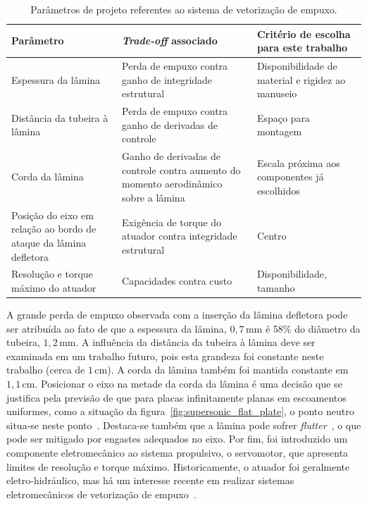\begin{table}[htbp]
    \centering\begin{tabular}{p{.3\linewidth}p{.3\linewidth}p{.3\linewidth}} \toprule
        Parâmetro & \textit{Trade-off} associado & Critério de escolha para este trabalho \\[.3cm] \midrule
        Espessura da lâmina & Perda de empuxo contra ganho de integridade estrutural & Disponibilidade de material e rigidez ao manuseio  \\[.3cm]
        Distância da tubeira à lâmina & Perda de empuxo contra ganho de derivadas de controle & Espaço para montagem\\[.3cm]
        Corda da lâmina & Ganho de derivadas de controle contra aumento do momento aerodinâmico sobre a lâmina & Escala próxima aos componentes já escolhidos\\[.3cm]
        Posição do eixo em relação ao bordo de ataque da lâmina defletora & Exigência de torque do atuador contra integridade estrutural & Centro\\[.3cm]
        Resolução e torque máximo do atuador & Capacidades contra custo & Disponibilidade, tamanho \\ \bottomrule
    \end{tabular}
    \caption{Parâmetros de projeto referentes ao sistema de vetorização de empuxo.}\label{tab:proj_params}
\end{table}

A grande perda de empuxo observada com a inserção da lâmina defletora pode ser atribuída ao fato de que a espessura da lâmina, \(0,7\,\mathrm{mm}\) é 58\% do diâmetro da tubeira, \(1,2\,\mathrm{mm}\). A influência da distância da tubeira à lâmina deve ser examinada em um trabalho futuro, pois esta grandeza foi constante neste trabalho (cerca de \(1\,\mathrm{cm}\)). A corda da lâmina também foi mantida constante em \(1,1\,\mathrm{cm}\). Posicionar o eixo na metade da corda da lâmina é uma decisão que se justifica pela previsão de que para placas infinitamente planas em escoamentos uniformes, como a situação da figura~\ref{fig:supersonic_flat_plate}, o ponto neutro situa-se neste ponto~\cite{anderson}. Destaca-se também que a lâmina pode sofrer \textit{flutter}~\cite{flutter}, o que pode ser mitigado por engastes adequados no eixo. Por fim, foi introduzido um componente eletromecânico ao sistema propulsivo, o servomotor, que apresenta limites de resolução e torque máximo. Historicamente, o atuador foi geralmente eletro-hidráulico, mas há um interesse recente em realizar sistemas eletromecânicos de vetorização de empuxo~\cite{etvc}.